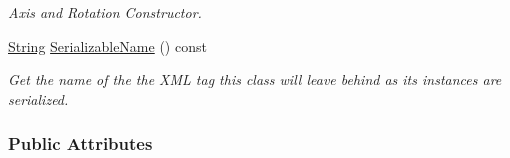 \begin{DoxyCompactItemize}
\begin{DoxyCompactList}\small\item\em Axis and Rotation Constructor. \item\end{DoxyCompactList}\item 
\hyperlink{namespacephys_aa03900411993de7fbfec4789bc1d392e}{String} \hyperlink{classphys_1_1Quaternion_abdfe885d36a7f3c2849a846214fb2872}{SerializableName} () const 
\begin{DoxyCompactList}\small\item\em Get the name of the the XML tag this class will leave behind as its instances are serialized. \item\end{DoxyCompactList}\end{DoxyCompactItemize}
\subsubsection*{Public Attributes}
